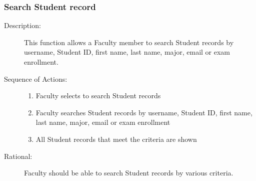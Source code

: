    \subsubsection{\large Search Student record} 
   \begin{boxed} %
      \begin{description}
         \item[Description:\label{desc:search_record}]
      This function allows a Faculty member to search Student records by
      username, Student ID, first name, last name, major, email or exam
      enrollment.
         
            \item[Sequence of Actions:]\hspace{10cm}
         \begin{enumerate}
            \item Faculty selects to search Student records
            \item Faculty searches Student records by username, Student ID,
               first name, last name, major, email or exam enrollment
            \item All Student records that meet the criteria are shown
      \end{enumerate}

            \item[Rational:]
         Faculty should be able to search Student records by various criteria.
      \end{description}
   \end{boxed} %


